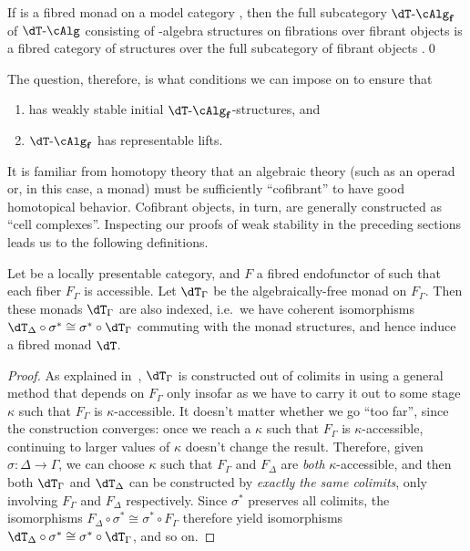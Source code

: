 \begin{enumerate}
\begin{lem}
  If \dT is a fibred monad on a model category \sM, then the full subcategory $\dT\algf$ of $\dT\alg$ consisting of \dT-algebra structures on fibrations over fibrant objects is a fibred category of structures over the full subcategory of fibrant objects \Mf.\qed
\end{lem}

The question, therefore, is what conditions we can impose on \dT to ensure that
\ifmpcps
  \begin{enumerate} \renewcommand{\theenumi}{(\arabic{enumi})}
\else
  \begin{enumerate}[label=(\arabic*)]
\fi
\item \fibmf has weakly stable initial $\dT\algf$-structures, and
\item $\dT\algf$ has representable lifts.
\end{enumerate}
It is familiar from homotopy theory that an algebraic theory (such as an operad or, in this case, a monad) must be sufficiently ``cofibrant'' to have good homotopical behavior.
Cofibrant objects, in turn, are generally constructed as ``cell complexes''.
Inspecting our proofs of weak stability in the preceding sections leads us to the following definitions.

\begin{lem}\label{thm:free-fibred}
  Let \sM be a locally presentable category, and $F$ a fibred endofunctor of \sM such that each fiber $F_\Gamma$ is accessible.
  Let $\dT_\Gamma$ be the algebraically-free monad on $F_\Gamma$.
  Then these monads $\dT_\Gamma$ are also indexed, i.e.\ we have coherent isomorphisms $\dT_\Delta \circ \sigma^* \cong \sigma^* \circ \dT_\Gamma$ commuting with the monad structures, and hence induce a fibred monad $\dT$.
\end{lem}
\begin{proof}
  As explained in~\cite{kelly:transfinite,nlab:transfinite}, $\dT_\Gamma$ is constructed out of colimits in \sM using a general method that depends on $F_\Gamma$ only insofar as we have to carry it out to some stage $\kappa$ such that $F_\Gamma$ is $\kappa$-accessible.
  It doesn't matter whether we go ``too far'', since the construction converges: once we reach a $\kappa$ such that $F_\Gamma$ is $\kappa$-accessible, continuing to larger values of $\kappa$ doesn't change the result.
  Therefore, given $\sigma:\Delta\to\Gamma$, we can choose $\kappa$ such that $F_\Gamma$ and $F_\Delta$ are \emph{both} $\kappa$-accessible, and then both $\dT_\Gamma$ and $\dT_\Delta$ can be constructed by \emph{exactly the same colimits}, only involving $F_\Gamma$ and $F_\Delta$ respectively.
  Since $\sigma^*$ preserves all colimits, the isomorphisms $F_\Delta \circ \sigma^* \cong \sigma^* \circ F_\Gamma$ therefore yield isomorphisms $\dT_\Delta \circ \sigma^* \cong \sigma^* \circ \dT_\Gamma$, and so on.
\end{proof}


\end{enumerate}
\end{enumerate}
